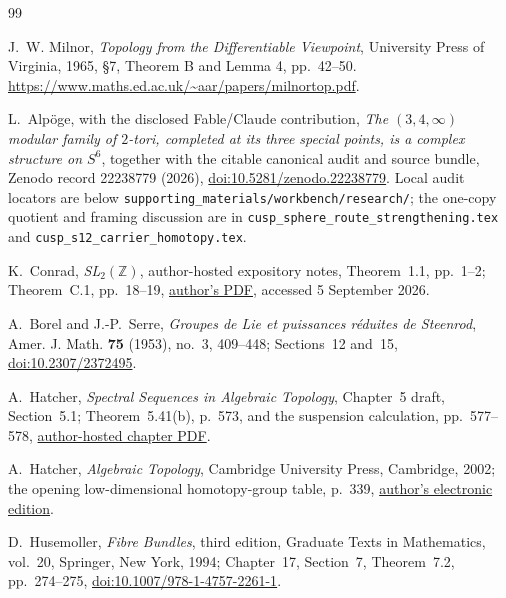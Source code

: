 \documentclass[11pt]{article}
\theoremstyle{definition}
\newcommand{\Z}{\mathbb Z}
\begin{document}
\begingroup
\sloppy
\raggedright
\begin{thebibliography}{99}

J.~W. Milnor, \emph{Topology from the Differentiable Viewpoint},
University Press of Virginia, 1965, \S7, Theorem B and Lemma 4,
pp.~42--50.
\url{https://www.maths.ed.ac.uk/~aar/papers/milnortop.pdf}.



L.~Alp\"oge, with the disclosed Fable/Claude contribution,
\emph{The \((3,4,\infty)\) modular family of \(2\)-tori, completed at its
three special points, is a complex structure on \(S^6\)}, together with
the citable canonical audit and source bundle, Zenodo record 22238779
(2026), \href{https://doi.org/10.5281/zenodo.22238779}
{doi:10.5281/zenodo.22238779}.  Local audit locators are below
\texttt{supporting\_materials/workbench/research/}; the one-copy quotient
and framing discussion are in
\texttt{cusp\_sphere\_route\_strengthening.tex} and
\texttt{cusp\_s12\_carrier\_homotopy.tex}.

K.~Conrad, \emph{SL\(_2(\Z)\)}, author-hosted expository notes,
Theorem~1.1, pp.~1--2; Theorem~C.1, pp.~18--19,
\href{https://kconrad.math.uconn.edu/blurbs/grouptheory/SL(2,Z).pdf}
{author's PDF}, accessed 5 September 2026.

A.~Borel and J.-P.~Serre,
\emph{Groupes de Lie et puissances r\'eduites de Steenrod},
Amer. J. Math. \textbf{75} (1953), no.~3, 409--448;
Sections~12 and~15,
\href{https://doi.org/10.2307/2372495}{doi:10.2307/2372495}.

A.~Hatcher,
\emph{Spectral Sequences in Algebraic Topology}, Chapter~5 draft,
Section~5.1; Theorem~5.41(b), p.~573, and the suspension calculation,
pp.~577--578,
\href{https://pi.math.cornell.edu/~hatcher/AT/ATch5.pdf}
{author-hosted chapter PDF}.

A.~Hatcher,
\emph{Algebraic Topology},
Cambridge University Press, Cambridge, 2002; the opening
low-dimensional homotopy-group table, p.~339,
\href{https://pi.math.cornell.edu/~hatcher/AT/ATpage.html}
{author's electronic edition}.

D.~Husemoller,
\emph{Fibre Bundles}, third edition,
Graduate Texts in Mathematics, vol.~20, Springer, New York, 1994;
Chapter~17, Section~7, Theorem~7.2, pp.~274--275,
\href{https://doi.org/10.1007/978-1-4757-2261-1}
{doi:10.1007/978-1-4757-2261-1}.


\end{thebibliography}
\end{document}
